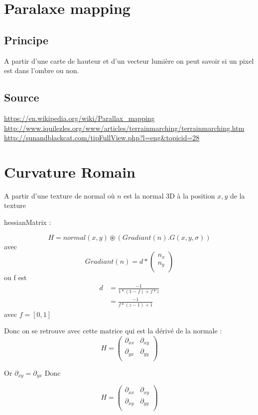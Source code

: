\documentclass[a4paper]{article}
\begin{document}
\section{Paralaxe mapping}   
\subsection{Principe}
A partir d'une carte de hauteur et d'un vecteur lumière on peut savoir si un pixel est dans l'ombre ou non. 

\subsection{Source}
\url{https://en.wikipedia.org/wiki/Parallax_mapping}\\
\url{http://www.iquilezles.org/www/articles/terrainmarching/terrainmarching.htm}\\
\url{http://sunandblackcat.com/tipFullView.php?l=eng&topicid=28}\\

\section{Curvature Romain}

A partir d'une texture de normal où $n$ est la normal 3D à la position $x,y$ de la texture

hessianMatrix :

\[H = normal(x,y)  \circledast (Gradiant(n).G(x,y,\sigma)) \]
avec
\[Gradiant(n) = d * 
\begin{pmatrix}
n_{x} \\
n_{y} \\
\end{pmatrix}\] 
ou f est 
\begin{align*}
d &= \frac{-1}{1*(1-f)+f*z} \\
  &= \frac{-1}{f*(z-1) +1}
\end{align*}
avec $f = [0,1]$

Donc on se retrouve avec cette matrice qui est la dérivé de la normale : 
\[H = 
\begin{pmatrix}
\partial_{xx} & \partial_{xy} \\
\partial_{yx} & \partial_{yy} \\
\end{pmatrix}\] 

Or $\partial_{xy} = \partial_{yx}$ Donc

\[H = 
\begin{pmatrix}
\partial_{xx} & \partial_{xy} \\
\partial_{xy} & \partial_{yy} \\
\end{pmatrix}\] 
\end{document}
